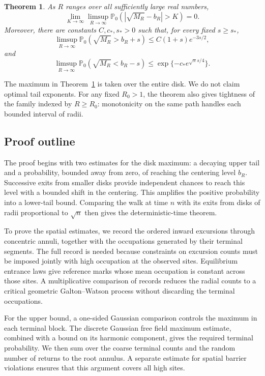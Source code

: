\documentclass[11pt,a4paper]{article}
\numberwithin{equation}{section}
\newtheorem{theorem}{Theorem}[section]
\theoremstyle{remark}
\begin{document}
\begin{theorem}\label{thm:disk}
As $R$ ranges over all sufficiently large real numbers,
\begin{equation}\label{eq:1.4}
\lim_{K\to\infty}\limsup_{R\to\infty}
\mathbb P_0\!\left(\left|\sqrt{M_R}-b_R\right|>K\right)=0.
\end{equation}
Moreover, there are constants $C,c_*,s_*>0$ such that, for every fixed $s\ge s_*$,
\begin{equation}\label{eq:1.6}
\limsup_{R\to\infty}\mathbb P_0(\sqrt{M_R}>b_R+s)
\le C(1+s)e^{-3s/2},
\end{equation}
and
\begin{equation}\label{eq:1.7}
\limsup_{R\to\infty}\mathbb P_0(\sqrt{M_R}<b_R-s)
\le\exp\{-c_*e^{\sqrt\pi s/4}\}.
\end{equation}
\end{theorem}

The maximum in Theorem~\ref{thm:disk} is taken over the entire disk. We do not claim optimal tail exponents. For any fixed $R_0>1$, the theorem also gives tightness of the family indexed by $R\ge R_0$: monotonicity on the same path handles each bounded interval of radii.

\subsection{Proof outline}\label{sec:outline}
The proof begins with two estimates for the disk maximum: a decaying upper tail and a probability, bounded away from zero, of reaching the centering level $b_R$. Successive exits from smaller disks provide independent chances to reach this level with a bounded shift in the centering. This amplifies the positive probability into a lower-tail bound. Comparing the walk at time $n$ with its exits from disks of radii proportional to $\sqrt n$ then gives the deterministic-time theorem.

To prove the spatial estimates, we record the ordered inward excursions through concentric annuli, together with the occupations generated by their terminal segments. The full record is needed because constraints on excursion counts must be imposed jointly with high occupation at the observed sites. Equilibrium entrance laws give reference marks whose mean occupation is constant across those sites. A multiplicative comparison of records reduces the radial counts to a critical geometric Galton--Watson process without discarding the terminal occupations.

For the upper bound, a one-sided Gaussian comparison controls the maximum in each terminal block. The discrete Gaussian free field maximum estimate, combined with a bound on its harmonic component, gives the required terminal probability. We then sum over the coarse terminal counts and the random number of returns to the root annulus. A separate estimate for spatial barrier violations ensures that this argument covers all high sites.
\end{document}
